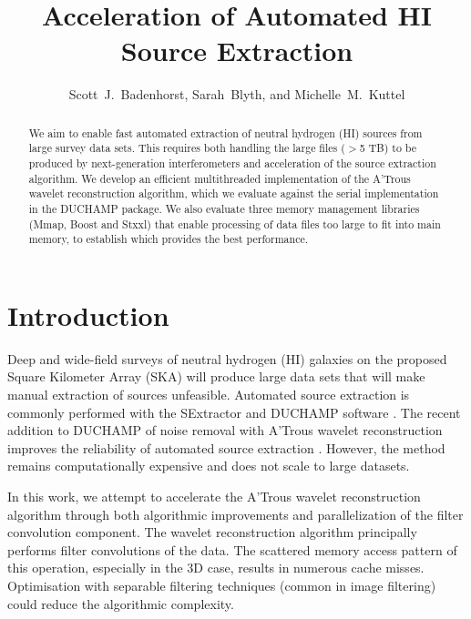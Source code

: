 
\resetcounters





\title{Acceleration of Automated HI Source Extraction} 

\author{Scott~J.~Badenhorst, Sarah~Blyth, and Michelle~M.~Kuttel
}


\begin{abstract}
We aim to enable fast automated extraction of neutral hydrogen (HI)  sources from large survey data sets. 
This requires both handling the large files ($>$5 TB) to be produced by next-generation interferometers and acceleration of  the source extraction algorithm. 
We develop an efficient multithreaded implementation of the A'Trous wavelet reconstruction algorithm, which we evaluate against the serial implementation in the DUCHAMP package.  We also evaluate three memory management libraries (Mmap, Boost and Stxxl) that enable processing of data files too large to fit into main memory, to establish which provides the best performance. 
\end{abstract}

\section{Introduction}

Deep and wide-field surveys of neutral hydrogen (HI) galaxies on the proposed Square Kilometer Array (SKA) will produce 
large data sets that will make manual extraction of sources unfeasible.  Automated source extraction is commonly performed with the SExtractor \citep{Bertin1996} and DUCHAMP software \citep{Whiting2012}.  
 The recent addition to DUCHAMP of  noise removal with A'Trous wavelet reconstruction \citep{West2010} improves the reliability of automated source extraction \citep{Popping2012, Whiting2012}.  
However, the method remains computationally expensive and does not scale to large datasets.  

In this work, we attempt to accelerate the A'Trous wavelet reconstruction algorithm through both algorithmic improvements and parallelization of the filter convolution component. 
The wavelet reconstruction algorithm  principally performs filter convolutions of the data. The scattered memory access pattern of this operation, especially in the 3D case, results in numerous cache misses.  Optimisation with separable filtering techniques (common in image filtering) could reduce the algorithmic complexity. 

